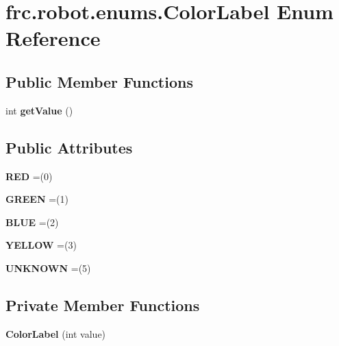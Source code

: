 \hypertarget{enumfrc_1_1robot_1_1enums_1_1_color_label}{}\section{frc.\+robot.\+enums.\+Color\+Label Enum Reference}
\label{enumfrc_1_1robot_1_1enums_1_1_color_label}
\subsection*{Public Member Functions}
\begin{DoxyCompactItemize}
\item 
\mbox{\label{enumfrc_1_1robot_1_1enums_1_1_color_label_a735f30c0b225b659d69b373e87264910}} 
int {\bfseries get\+Value} ()
\end{DoxyCompactItemize}
\subsection*{Public Attributes}
\begin{DoxyCompactItemize}
\item 
\mbox{\label{enumfrc_1_1robot_1_1enums_1_1_color_label_a3d6f0c30c7b4a964308bd068918194c4}} 
{\bfseries R\+ED} =(0)
\item 
\mbox{\label{enumfrc_1_1robot_1_1enums_1_1_color_label_a8ab8f22b8c9a22fc50abb4bdb4a55977}} 
{\bfseries G\+R\+E\+EN} =(1)
\item 
\mbox{\label{enumfrc_1_1robot_1_1enums_1_1_color_label_ad91c9c83c2313806c9b58d57e9ef655b}} 
{\bfseries B\+L\+UE} =(2)
\item 
\mbox{\label{enumfrc_1_1robot_1_1enums_1_1_color_label_a12d86aa758e992db59debe432360e77d}} 
{\bfseries Y\+E\+L\+L\+OW} =(3)
\item 
\mbox{\label{enumfrc_1_1robot_1_1enums_1_1_color_label_afe96742ac5b43aa4330da6ece723160c}} 
{\bfseries U\+N\+K\+N\+O\+WN} =(5)
\end{DoxyCompactItemize}
\subsection*{Private Member Functions}
\begin{DoxyCompactItemize}
\item 
\mbox{\label{enumfrc_1_1robot_1_1enums_1_1_color_label_add5c6b015ac785380176f525fcf41d67}} 
{\bfseries Color\+Label} (int value)
\end{DoxyCompactItemize}
